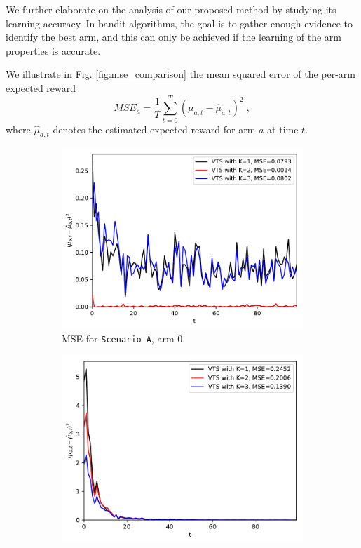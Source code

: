 \documentclass[10pt]{article}
\begin{document}
We further elaborate on the analysis of our proposed method by studying its learning accuracy. In bandit algorithms, the goal is to gather enough evidence to identify the best arm, and this can only be achieved if the learning of the arm properties is accurate.

We illustrate in Fig. \ref{fig:mse_comparison} the mean squared error of the per-arm expected reward
\begin{equation}
MSE_a=\frac{1}{T}\sum_{t=0}^T \left(\mu_{a,t}-\hat{\mu}_{a,t} \right)^2 \; ,
\end{equation}
where $\hat{\mu}_{a,t}$ denotes the estimated expected reward for arm $a$ at time $t$.

\begin{figure}[!h]
	\centering
	\begin{subfigure}[b]{0.48\textwidth}
		\includegraphics[width=\textwidth]{./figs/model_a_mse_arm_0.pdf}
		\caption{MSE for \texttt{Scenario A}, arm 0.}
		\label{fig:model_a_mse_arm_0}
	\end{subfigure}
	\begin{subfigure}[b]{0.46\textwidth}
		\includegraphics[width=\textwidth]{./figs/model_a_mse_arm_1.pdf}

\end{subfigure}
\end{figure}
\end{document}
